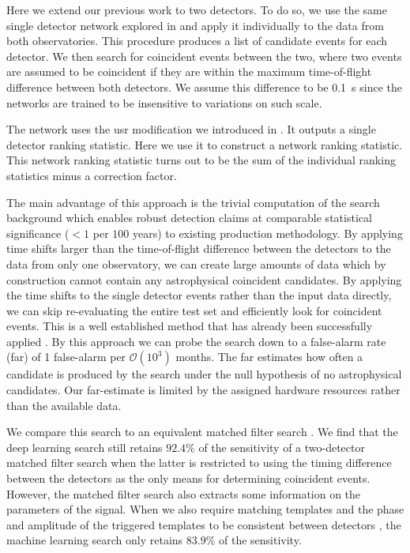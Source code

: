 Here we extend our previous work to two detectors. To do so, we use the same single detector network explored in \cite{Schafer:2021fea} and apply it individually to the data from both observatories. This procedure produces a list of candidate events for each detector. We then search for coincident events between the two, where two events are assumed to be coincident if they are within the maximum time-of-flight difference between both detectors. We assume this difference to be \SI{0.1}{\second} since the networks are trained to be insensitive to variations on such scale.

The network uses the \acrfull{usr} modification we introduced in \cite{Schafer:2021fea}. It outputs a single detector ranking statistic. Here we use it to construct a network ranking statistic. This network ranking statistic turns out to be the sum of the individual ranking statistics minus a correction factor.

The main advantage of this approach is the trivial computation of the search background which enables robust detection claims at comparable statistical significance ($<1$ per $100$ years) to existing production methodology. By applying time shifts larger than the time-of-flight difference between the detectors to the data from only one observatory, we can create large amounts of data which by construction cannot contain any astrophysical coincident candidates. By applying the time shifts to the single detector events rather than the input data directly, we can skip re-evaluating the entire test set and efficiently look for coincident events. This is a well established method that has already been successfully applied \cite{LIGOScientific:2020ibl, Usman:2015kfa, Sachdev:2019vvd}. By this approach we can probe the search down to a false-alarm rate (\acrshort{far}) of 1 false-alarm per $\mathcal{O}\left(10^3\right)$ months. The \acrshort{far} estimates how often a candidate is produced by the search under the null hypothesis of no astrophysical candidates. Our \acrshort{far}-estimate is limited by the assigned hardware resources rather than the available data.

We compare this search to an equivalent matched filter search \cite{pycbc_version}. We find that the deep learning search still retains $92.4\%$ of the sensitivity of a two-detector matched filter search when the latter is restricted to using the timing difference between the detectors as the only means for determining coincident events. However, the matched filter search also extracts some information on the parameters of the signal. When we also require matching templates and the phase and amplitude of the triggered templates to be consistent between detectors \cite{Nitz:2017svb}, the machine learning search only retains $83.9\%$ of the sensitivity.

